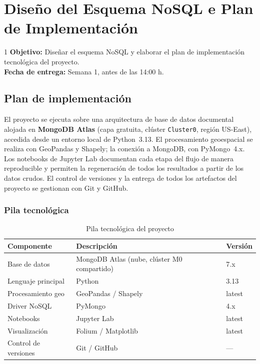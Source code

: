 \documentclass[12pt, a4paper]{report}
\begin{document}
\chapter{Diseño del Esquema NoSQL e Plan de Implementación}
\label{cap:entrega1}

\begin{semanabox}[Entrega 1]{1}
  \textbf{Objetivo:} Diseñar el esquema NoSQL y elaborar el plan de implementación
  tecnológica del proyecto.\\
  \textbf{Fecha de entrega:} Semana 1, antes de las 14:00 h.
\end{semanabox}

\section{Plan de implementación}

El proyecto se ejecuta sobre una arquitectura de base de datos documental alojada en
\textbf{MongoDB Atlas} (capa gratuita, clúster \texttt{Cluster0}, región US-East),
accedida desde un entorno local de Python~3.13. El procesamiento geoespacial se
realiza con GeoPandas y Shapely; la conexión a MongoDB, con PyMongo~4.x. Los
notebooks de Jupyter Lab documentan cada etapa del flujo de manera reproducible y
permiten la regeneración de todos los resultados a partir de los datos crudos.
El control de versiones y la entrega de todos los artefactos del proyecto se gestionan
con Git y GitHub.

\subsection{Pila tecnológica}

\begin{table}[H]
  \centering
  \caption{Pila tecnológica del proyecto}
  \label{tab:pila}
  \begin{tabularx}{\textwidth}{lXl}
    \toprule
    \textbf{Componente} & \textbf{Descripción} & \textbf{Versión} \\
    \midrule
    Base de datos        & MongoDB Atlas (nube, clúster M0 compartido) & 7.x \\
    Lenguaje principal   & Python & 3.13 \\
    Procesamiento geo    & GeoPandas / Shapely & latest \\
    Driver NoSQL         & PyMongo & 4.x \\
    Notebooks            & Jupyter Lab & latest \\
    Visualización        & Folium / Matplotlib & latest \\
    Control de versiones & Git / GitHub & — \\
    \bottomrule
  \end{tabularx}
\end{table}
\end{document}
